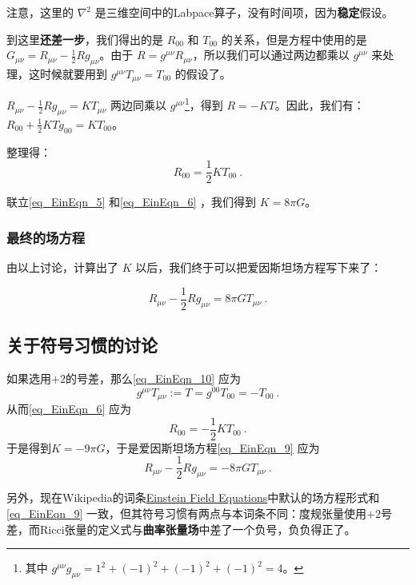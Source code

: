 注意，这里的 $\nabla^2$ 是三维空间中的Labpace算子，没有时间项，因为\textbf{稳定}假设。


到这里\textbf{还差一步}，我们得出的是 $R_{00}$ 和 $T_{00}$ 的关系，但是方程中使用的是 $G_{\mu\nu}=R_{\mu\nu}-\frac{1}{2}Rg_{\mu\nu}$。由于 $R=g^{\mu\nu}R_{\mu\nu}$，所以我们可以通过两边都乘以 $g^{\mu\nu}$ 来处理，这时候就要用到 $g^{\mu\nu}T_{\mu\nu}=T_{00}$ 的假设了。

$R_{\mu\nu}-\frac{1}{2}Rg_{\mu\nu}=KT_{\mu\nu}$ 两边同乘以 $g^{\mu\nu}$\footnote{其中 $g^{\mu\nu}g_{\mu\nu}=1^2+(-1)^2+(-1)^2+(-1)^2=4$。}，得到 $R=-KT$。因此，我们有：$R_{00}+\frac{1}{2}KTg_{00}=KT_{00}$。



整理得：
\begin{equation}\label{eq_EinEqn_6}
R_{00}=\frac{1}{2}KT_{00}~.
\end{equation}

联立\autoref{eq_EinEqn_5} 和\autoref{eq_EinEqn_6} ，我们得到 $K=8\pi G$。

\subsubsection{最终的场方程}

由以上讨论，计算出了 $K$ 以后，我们终于可以把爱因斯坦场方程写下来了：

\begin{equation}\label{eq_EinEqn_9}
R_{\mu\nu}-\frac{1}{2}Rg_{\mu\nu}=8\pi GT_{\mu\nu}~.
\end{equation}





\subsection{关于符号习惯的讨论}


如果选用$+2$的号差，那么\autoref{eq_EinEqn_10} 应为
\begin{equation}
g^{\mu\nu}T_{\mu\nu}:=T=g^{00}T_{00}=-T_{00}~.
\end{equation}
从而\autoref{eq_EinEqn_6}  应为
\begin{equation}
R_{00}=-\frac{1}{2}KT_{00}~.
\end{equation}
于是得到$K=-9\pi G$，于是爱因斯坦场方程\autoref{eq_EinEqn_9} 应为
\begin{equation}
R_{\mu\nu}-\frac{1}{2}Rg_{\mu\nu}=-8\pi GT_{\mu\nu}~.
\end{equation}

另外，现在Wikipedia的词条\href{https://en.wikipedia.org/wiki/Einstein_field_equations}{Einstein Field Equations}中默认的场方程形式和\autoref{eq_EinEqn_9} 一致，但其符号习惯有两点与本词条不同：度规张量使用$+2$号差，而Ricci张量的定义式与\textbf{曲率张量场}中差了一个负号，负负得正了。











